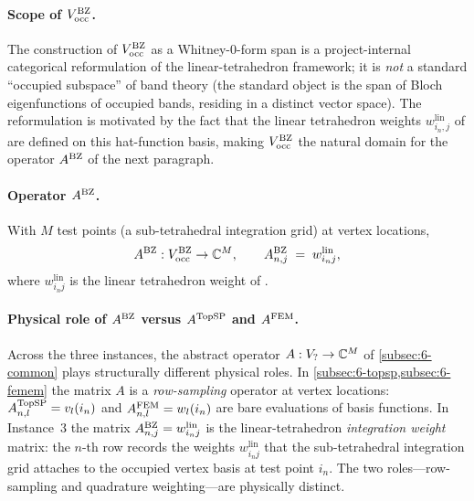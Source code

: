 \paragraph{Scope of $V_{\mathrm{occ}}^{\mathrm{BZ}}$.}
The construction of $V_{\mathrm{occ}}^{\mathrm{BZ}}$ as a Whitney-$0$-form span is a
project-internal categorical reformulation of the linear-tetrahedron
framework; it is \emph{not} a standard ``occupied subspace'' of band
theory (the standard object is the span of Bloch eigenfunctions of
occupied bands, residing in a distinct vector space). The
reformulation is motivated by the fact that the linear tetrahedron
weights $w^{\mathrm{lin}}_{i_n, j}$ of
\cite{Blochl1994,LehmannTaut1972,JepsenAndersen1971} are defined on
this hat-function basis, making $V_{\mathrm{occ}}^{\mathrm{BZ}}$ the natural domain
for the operator $A^{\mathrm{BZ}}$ of the next paragraph.

\paragraph{Operator $A^{\mathrm{BZ}}$.}
With $M$ test points (a sub-tetrahedral integration grid) at vertex
locations,
\[
  A^{\mathrm{BZ}} : V_{\mathrm{occ}}^{\mathrm{BZ}} \to \mathbb{C}^M,
  \qquad
  A^{\mathrm{BZ}}_{n, j}
  \;=\;
  w_{i_n j}^{\mathrm{lin}},
\]
where $w_{i_n j}^{\mathrm{lin}}$ is the linear tetrahedron weight of
\cite{LehmannTaut1972,JepsenAndersen1971}.

\paragraph{Physical role of $A^{\mathrm{BZ}}$ versus $A^{\mathrm{TopSP}}$ and $A^{\mathrm{FEM}}$.}
Across the three instances, the abstract operator $A : V_? \to \mathbb{C}^M$
of \cref{subsec:6-common} plays structurally different physical
roles. In \cref{subsec:6-topsp,subsec:6-femem} the matrix $A$ is a
\emph{row-sampling} operator at vertex locations:
$A^{\mathrm{TopSP}}_{n,l} = v_l(i_n)$ and $A^{\mathrm{FEM}}_{n,l} = w_l(i_n)$ are
bare evaluations of basis functions. In Instance~3 the matrix
$A^{\mathrm{BZ}}_{n,j} = w_{i_n j}^{\mathrm{lin}}$ is the
linear-tetrahedron \emph{integration weight} matrix: the $n$-th row
records the weights $w_{i_n j}^{\mathrm{lin}}$ that the
sub-tetrahedral integration grid attaches to the occupied vertex
basis at test point $i_n$. The two roles---row-sampling and
quadrature weighting---are physically distinct.


